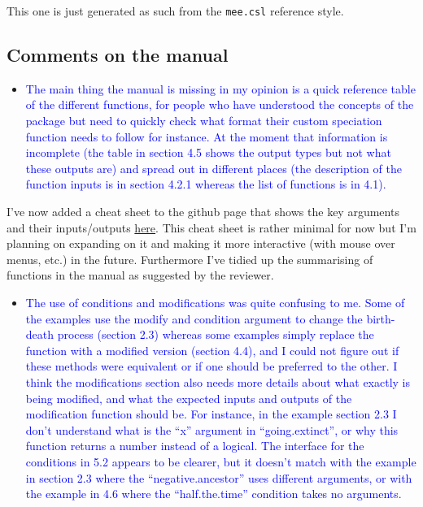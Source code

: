 \documentclass[
]{article}
\providecommand{\tightlist}{%
  \setlength{\itemsep}{0pt}\setlength{\parskip}{0pt}}
\begin{document}
This one is just generated as such from the \texttt{mee.csl} reference
style.

\hypertarget{comments-on-the-manual}{%
\subsection{Comments on the manual}\label{comments-on-the-manual}}

\begin{itemize}
\tightlist
\item
  \textcolor{blue}{The main thing the manual is missing in my opinion is a quick
  reference table of the different functions, for people who have
  understood the concepts of the package but need to quickly check what
  format their custom speciation function needs to follow for instance.
  At the moment that information is incomplete (the table in section 4.5
  shows the output types but not what these outputs are) and spread out
  in different places (the description of the function inputs is in
  section 4.2.1 whereas the list of functions is in 4.1).}
\end{itemize}

I've now added a cheat sheet to the github page that shows the key
arguments and their inputs/outputs
\href{https://github.com/TGuillerme/treats/blob/master/inst/gitbook/treats_cheat_sheet.pdf}{here}.
This cheat sheet is rather minimal for now but I'm planning on expanding
on it and making it more interactive (with mouse over menus, etc.) in
the future. Furthermore I've tidied up the summarising of functions in
the manual as suggested by the reviewer.

\begin{itemize}
\tightlist
\item
  \textcolor{blue}{The use of conditions and modifications was quite confusing to me.
  Some of the examples use the modify and condition argument to change
  the birth-death process (section 2.3) whereas some examples simply
  replace the function with a modified version (section 4.4), and I
  could not figure out if these methods were equivalent or if one should
  be preferred to the other. I think the modifications section also
  needs more details about what exactly is being modified, and what the
  expected inputs and outputs of the modification function should be.
  For instance, in the example section 2.3 I don't understand what is
  the ``x'' argument in ``going.extinct'', or why this function returns
  a number instead of a logical. The interface for the conditions in 5.2
  appears to be clearer, but it doesn't match with the example in
  section 2.3 where the ``negative.ancestor'' uses different arguments,
  or with the example in 4.6 where the ``half.the.time'' condition takes
  no arguments. }
\end{itemize}
\end{document}
